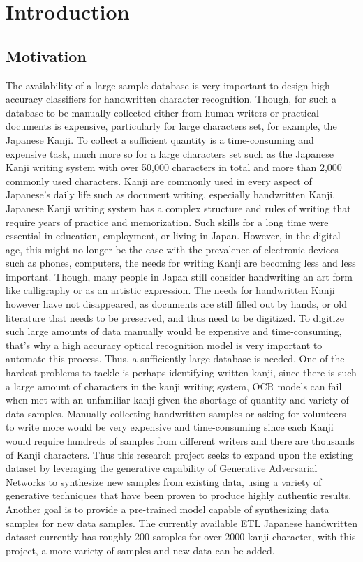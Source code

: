 \documentclass[12pt]{report}
\begin{document}
\newpage
{}
\listoffigures

\newpage
{}
\setcounter{page}{1}
\chapter{Introduction}
\label{chap:intro}

\section{Motivation}
The availability of a large sample database is very important to design high-accuracy
classifiers for handwritten character recognition. Though, for such a database to be manually collected either from human writers or practical documents is expensive, particularly for large characters set, for example, the Japanese Kanji. To
collect a sufficient quantity is a time-consuming and expensive task, much more so
for a large characters set such as the Japanese Kanji writing system with over 50,000
characters in total and more than 2,000 commonly used characters. Kanji are
commonly used in every aspect of Japanese’s daily life such as document writing,
especially handwritten Kanji.
Japanese Kanji writing system has a complex structure and rules of writing that
require years of practice and memorization. Such skills for a long time were
essential in education, employment, or living in Japan. However, in the digital age,
this might no longer be the case with the prevalence of electronic devices such as
phones, computers, the needs for writing Kanji are becoming less and less important.
Though, many people in Japan still consider handwriting an art form like calligraphy
or as an artistic expression. The needs for handwritten Kanji however have not
disappeared, as documents are still filled out by hands, or old literature that needs to be preserved, and thus need to be digitized. To digitize such large amounts of data manually would be expensive and time-consuming, that’s why a high accuracy optical recognition model is very important to automate this process. Thus, a sufficiently large database is needed.
One of the hardest problems to tackle is perhaps identifying written kanji, since there
is such a large amount of characters in the kanji writing system, OCR models can fail
when met with an unfamiliar kanji given the shortage of quantity and variety of data
samples. Manually collecting handwritten samples or asking for volunteers to write more would be very expensive and time-consuming since each Kanji would require hundreds of samples from different writers and there are thousands of Kanji characters. Thus this research project seeks to expand upon the existing dataset by
leveraging the generative capability of Generative Adversarial Networks to
synthesize new samples from existing data, using a variety of generative techniques
that have been proven to produce highly authentic results. Another goal is to provide
a pre-trained model capable of synthesizing data samples for new data samples.
The currently available ETL Japanese handwritten dataset \cite{etl} currently has roughly 200
samples for over 2000 kanji character, with this project, a more variety of samples
and new data can be added.
\end{document}
